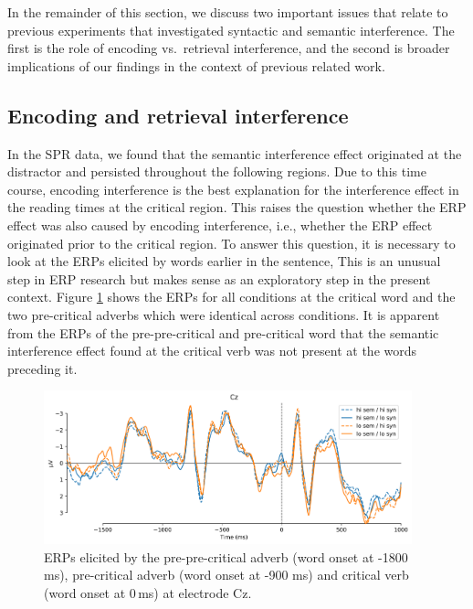 \documentclass[a4paper, man, floatsintext]{apa7}
\begin{document}
In the remainder of this section, we discuss two important issues that relate to previous experiments that investigated syntactic and semantic interference. The first is the role of encoding vs.\ retrieval interference, and the second is broader implications of our findings in the context of previous related work.

\subsection{Encoding and retrieval interference}
In the SPR data, we found that the semantic interference effect originated at the distractor and persisted throughout the following regions. Due to this time course, encoding interference \parencite{Yadavetal2022,hammerly2019grammaticality} is the best explanation for the interference effect in the reading times at the critical region. This raises the question whether the ERP effect was also caused by encoding interference, i.e., whether the ERP effect originated prior to the critical region. To answer this question, it is necessary to look at the ERPs elicited by words earlier in the sentence, This is an unusual step in ERP research but makes sense as an exploratory step in the present context. Figure \ref{fig:erp_precrit} shows the ERPs for all conditions at the critical word and the two pre-critical adverbs which were identical across conditions. It is apparent from the ERPs of the pre-pre-critical and pre-critical word that the semantic interference effect found at the critical verb was not present at the words preceding it. 

\begin{figure}[H]
    \caption{ERPs elicited by the pre-pre-critical adverb (word onset at -1800 ms), pre-critical adverb (word onset at -900 ms) and critical verb (word onset at 0\,ms) at electrode Cz.}
    \label{fig:erp_precrit}
    \centering
    \includegraphics[width=0.95\textwidth]{images/N_103_Cz_precrit.png}
\end{figure}
\end{document}
